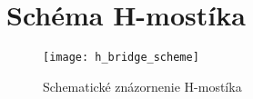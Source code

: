 \chapter{Schéma H-mostíka}
\begin{figure}[h]
\centering
\texttt{[image: h\_bridge\_scheme]}
\caption{Schematické znázornenie H-mostíka}
\label{fig:h_bridge_scheme}
\end{figure}